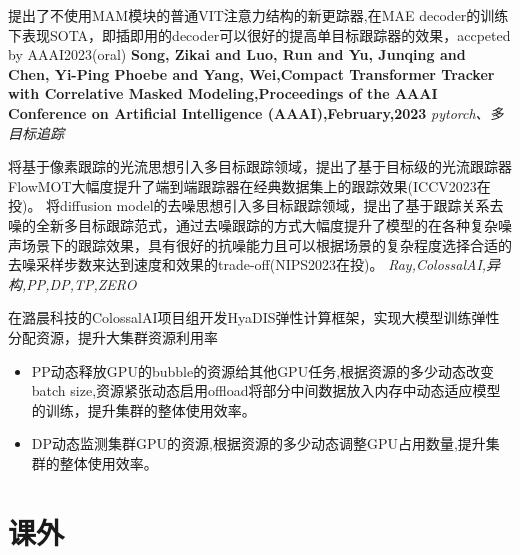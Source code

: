 \documentclass{uniquecv}
\begin{document}
提出了不使用MAM模块的普通VIT注意力结构的新更踪器,在MAE decoder的训练下表现SOTA，即插即用的decoder可以很好的提高单目标跟踪器的效果，accpeted by AAAI2023(oral) 
\textbf{Song, Zikai and Luo, Run and Yu, Junqing and Chen, Yi-Ping Phoebe and Yang, Wei,Compact Transformer Tracker with Correlative Masked Modeling,Proceedings of the AAAI Conference on Artificial Intelligence (AAAI),February,2023}
\textit{pytorch、多目标追踪}
\vspace{0.4ex}

将基于像素跟踪的光流思想引入多目标跟踪领域，提出了基于目标级的光流跟踪器FlowMOT大幅度提升了端到端跟踪器在经典数据集上的跟踪效果(ICCV2023在投)。
将diffusion model的去噪思想引入多目标跟踪领域，提出了基于跟踪关系去噪的全新多目标跟踪范式，通过去噪跟踪的方式大幅度提升了模型的在各种复杂噪声场景下的跟踪效果，具有很好的抗噪能力且可以根据场景的复杂程度选择合适的去噪采样步数来达到速度和效果的trade-off(NIPS2023在投)。
\textit{Ray,ColossalAI,异构,PP,DP,TP,ZERO}
\vspace{0.4ex}

在潞晨科技的ColossalAI项目组开发HyaDIS弹性计算框架，实现大模型训练弹性分配资源，提升大集群资源利用率
\begin{itemize}
  \item PP动态释放GPU的bubble的资源给其他GPU任务,根据资源的多少动态改变batch size,资源紧张动态启用offload将部分中间数据放入内存中动态适应模型的训练，提升集群的整体使用效率。
 \item DP动态监测集群GPU的资源,根据资源的多少动态调整GPU占用数量,提升集群的整体使用效率。
\end{itemize}
\section{课外}
\end{document}
